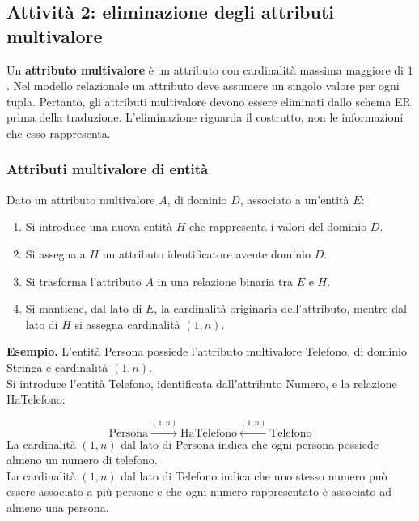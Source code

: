 \subsection{Attività 2: eliminazione degli attributi multivalore}
Un \textbf{attributo multivalore} è un attributo
con cardinalità massima maggiore di $1$.
Nel modello relazionale un attributo deve assumere
un singolo valore per ogni tupla. Pertanto, gli
attributi multivalore devono essere eliminati
dallo schema ER prima della traduzione.
L'eliminazione riguarda il costrutto, non le
informazioni che esso rappresenta.

\subsubsection{Attributi multivalore di entità}
Dato un attributo multivalore $A$, di dominio $D$,
associato a un'entità $E$:
\begin{enumerate}
    \item Si introduce una nuova entità $H$ che
    rappresenta i valori del dominio $D$.

    \item Si assegna a $H$ un attributo identificatore
    avente dominio $D$.

    \item Si trasforma l'attributo $A$ in una relazione
    binaria tra $E$ e $H$.

    \item Si mantiene, dal lato di $E$, la cardinalità
    originaria dell'attributo, mentre dal lato di $H$
    si assegna cardinalità $(1,n)$.
\end{enumerate}
\medskip
\noindent
\textcolor{verdeEsempio}{\textbf{Esempio. }}
L'entità Persona possiede l'attributo multivalore
Telefono, di dominio Stringa e cardinalità $(1,n)$.\\
Si introduce l'entità Telefono, identificata
dall'attributo Numero, e la relazione HaTelefono:

\[
\boxed{\text{Persona}}
\xrightarrow{(1,n)}
\text{HaTelefono}
\xleftarrow{(1,n)}
\boxed{\text{Telefono}}
\]
La cardinalità $(1,n)$ dal lato di Persona indica
che ogni persona possiede almeno un numero di telefono.\\
La cardinalità $(1,n)$ dal lato di Telefono indica
che uno stesso numero può essere associato a più
persone e che ogni numero rappresentato è associato
ad almeno una persona.

